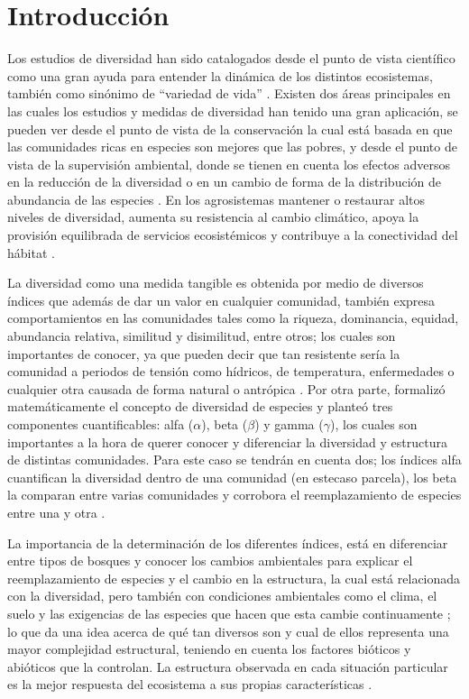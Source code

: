 \documentclass[conference,final,12pt,]{IEEEtran}
\begin{document}
\hypertarget{introducciuxf3n}{%
\section{Introducción}\label{introducciuxf3n}}

Los estudios de diversidad han sido catalogados desde el punto de vista
científico como una gran ayuda para entender la dinámica de los
distintos ecosistemas, también como sinónimo de ``variedad de vida''
\citep{A}. Existen dos áreas principales en las cuales los estudios y
medidas de diversidad han tenido una gran aplicación, se pueden ver
desde el punto de vista de la conservación la cual está basada
en que las comunidades ricas en especies son mejores que las pobres, y
desde el punto de vista de la supervisión ambiental, donde se tienen en
cuenta los efectos adversos en la reducción de la diversidad o en un
cambio de forma de la distribución de abundancia de las especies
\citep{B}. En los agrosistemas mantener o restaurar altos niveles de
diversidad, aumenta su resistencia al cambio climático, apoya la
provisión equilibrada de servicios ecosistémicos y contribuye a la
conectividad del hábitat \citep{C}.

La diversidad como una medida tangible es obtenida por medio de diversos
índices que además de dar un valor en cualquier comunidad, también
expresa comportamientos en las comunidades tales como la riqueza,
dominancia, equidad, abundancia relativa, similitud y disimilitud, entre
otros; los cuales son importantes de conocer, ya que pueden decir que
tan resistente sería la comunidad a periodos de tensión como
hídricos, de temperatura, enfermedades o cualquier otra causada de forma
natural o antrópica \citep{D}. Por otra parte, \citep{E} formalizó
matemáticamente el concepto de diversidad de especies y planteó tres
componentes cuantificables: alfa (\(\alpha\)), beta (\(\beta\)) y gamma
(\(\gamma\)), los cuales son importantes a la hora de querer conocer y
diferenciar la diversidad y estructura de distintas comunidades. Para este 
caso se tendrán en cuenta dos; los índices alfa cuantifican la diversidad dentro de una comunidad (en estecaso parcela), los beta la comparan entre varias comunidades y corrobora el reemplazamiento de especies entre una y otra \citep{G}.

La importancia de la determinación de los diferentes índices, está en
diferenciar entre tipos de bosques y conocer los cambios ambientales
para explicar el reemplazamiento de especies y el cambio en la
estructura, la cual está relacionada con la diversidad, pero también con
condiciones ambientales como el clima, el suelo\citep{H} y las exigencias
de las especies \citep{J} que hacen que esta cambie continuamente
\citep{I}; lo que da una idea acerca de qué tan diversos son y cual de
ellos representa una mayor complejidad estructural, teniendo en cuenta
los factores bióticos y abióticos que la controlan. La
estructura observada en cada situación particular es la mejor respuesta
del ecosistema a sus propias características \citep{F}.
\end{document}
